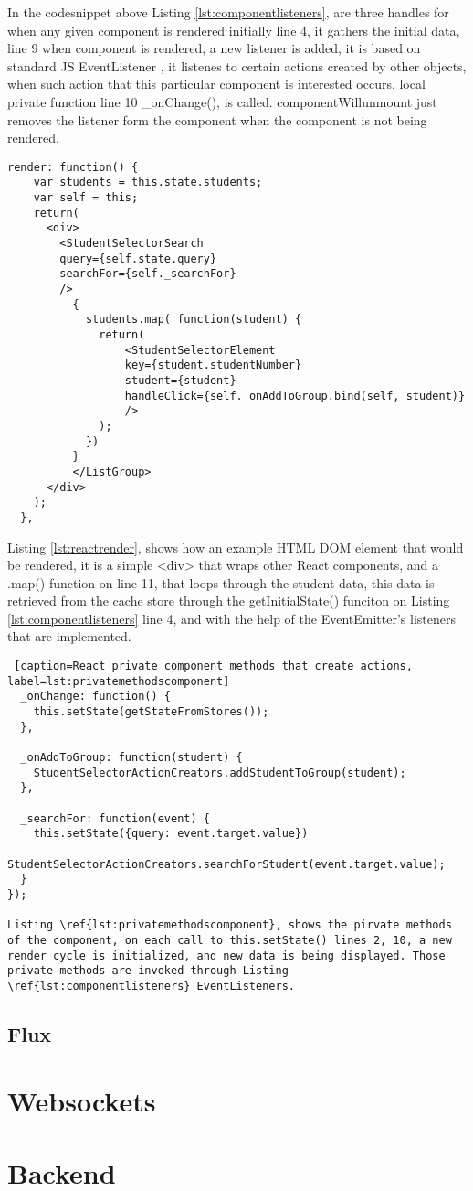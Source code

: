 In the codesnippet above Listing \ref{lst:componentlisteners}, are three handles for when any given component  is rendered initially line 4, it gathers the initial data, line 9 when component is rendered, a new listener is added, it is based on standard JS EventListener \cite{eventlistener}, it listenes to certain actions created by other objects, when such action that this particular component is interested occurs, local private function line 10 \_onChange(), is called. componentWillunmount just removes the listener form the component when the component is not being rendered.
\newpage
\begin{lstlisting}[caption=React render method rendering when the state is updated, label=lst:reactrender]
  render: function() {
    var students = this.state.students;
    var self = this;
    return(
      <div>
        <StudentSelectorSearch
        query={self.state.query}
        searchFor={self._searchFor}
        />
          {
            students.map( function(student) {
              return(
                  <StudentSelectorElement
                  key={student.studentNumber}
                  student={student}
                  handleClick={self._onAddToGroup.bind(self, student)}
                  />
              );
            })
          }
          </ListGroup>
      </div>
    );
  },
\end{lstlisting}

Listing \ref{lst:reactrender}, shows how an example HTML DOM element that would be rendered, it is a simple <div> that wraps other React components, and a .map() function on line 11, that loops through the student data, this data is retrieved from the cache store through the getInitialState() funciton on Listing \ref{lst:componentlisteners} line 4, and with the help of the EventEmitter's listeners that are implemented.
\newpage
\begin{lstlisting} [caption=React private component methods that create actions, label=lst:privatemethodscomponent]
  _onChange: function() {
    this.setState(getStateFromStores());
  },

  _onAddToGroup: function(student) {
    StudentSelectorActionCreators.addStudentToGroup(student);
  },

  _searchFor: function(event) {
    this.setState({query: event.target.value})
    StudentSelectorActionCreators.searchForStudent(event.target.value);
  }
});

Listing \ref{lst:privatemethodscomponent}, shows the pirvate methods of the component, on each call to this.setState() lines 2, 10, a new render cycle is initialized, and new data is being displayed. Those private methods are invoked through Listing \ref{lst:componentlisteners} EventListeners.

\end{lstlisting}


\subsection{Flux}

\section{Websockets}

\section{Backend}

